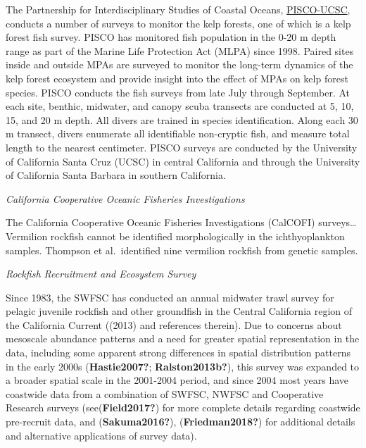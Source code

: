 \documentclass[11pt,
  english,
  a4paper,
]{article}
\begin{document}
The Partnership for Interdisciplinary Studies of Coastal Oceans, {\href{http://www.piscoweb.org/kelp-forest-study}{PISCO-UCSC}\leavevmode\tagmcend\tagstructend}, conducts a number of surveys to monitor the kelp forests, one of which is a kelp forest fish survey. PISCO has monitored fish population in the 0-20 m depth range as part of the Marine Life Protection Act (MLPA) since 1998. Paired sites inside and outside MPAs are surveyed to monitor the long-term dynamics of the kelp forest ecosystem and provide insight into the effect of MPAs on kelp forest species. PISCO conducts the fish surveys from late July through September. At each site, benthic, midwater, and canopy scuba transects are conducted at 5, 10, 15, and 20 m depth. All divers are trained in species identification. Along each 30 m transect, divers enumerate all identifiable non-cryptic fish, and measure total length to the nearest centimeter. PISCO surveys are conducted by the University of California Santa Cruz (UCSC) in central California and through the University of California Santa Barbara in southern California.

\emph{California Cooperative Oceanic Fisheries Investigations}

The California Cooperative Oceanic Fisheries Investigations (CalCOFI) surveys\ldots{} Vermilion rockfish cannot be identified morphologically in the ichthyoplankton samples. Thompson et al.~identified nine vermilion rockfish from genetic samples.

\emph{Rockfish Recruitment and Ecosystem Survey}

Since 1983, the SWFSC has conducted an annual midwater trawl survey for pelagic juvenile rockfish and other groundfish in the Central California region of the California Current ({(2013)\leavevmode\tagmcend\tagstructend} and references therein). Due to concerns about mesoscale abundance patterns and a need for greater spatial representation in the data, including some apparent strong differences in spatial distribution patterns in the early 2000s {(\textbf{Hastie2007?}; \textbf{Ralston2013b?})\leavevmode\tagmcend\tagstructend}, this survey was expanded to a broader spatial scale in the 2001-2004 period, and since 2004 most years have coastwide data from a combination of SWFSC, NWFSC and Cooperative Research surveys (see{(\textbf{Field2017?})\leavevmode\tagmcend\tagstructend} for more complete details regarding coastwide pre-recruit data, and {(\textbf{Sakuma2016?})\leavevmode\tagmcend\tagstructend}, {(\textbf{Friedman2018?})\leavevmode\tagmcend\tagstructend} for additional details and alternative applications of survey data).
\end{document}
